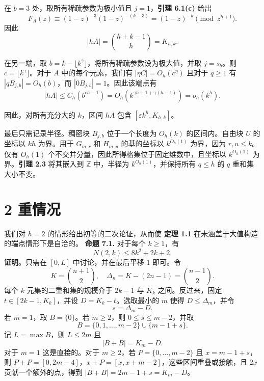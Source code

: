 \documentclass[11pt]{article}
\theoremstyle{break}
\begin{document}
在 $b = 3$ 处，取所有稀疏参数为极小值且 $j = 1$，\textbf{引理 6.1(c)} 给出
\[F_A(z) \equiv (1-z)^{-3}(1-z)^{-(k-3)} = (1-z)^{-k} \pmod{z^{h+1}}.\]
因此
\[|hA| = \binom{h+k-1}{h} = K_{h,k}.\]

在另一端，取 $b = k - \lfloor k^\gamma \rfloor$，将所有稀疏参数设为极大值，并取 $j = s_b$。则 $c = \lfloor k^\gamma \rfloor$。对于 $A$ 中的每个元素，我们有 $|\eta C| = O_h(c^\eta)$ 且对于 $q \ge 1$ 有 $|qB_{j,b}| = O_h(b)$，而 $|0B_{j,b}| = 1$。因此该端点有
\[|hA| \le C_h (b^{ch-1}) = O_h(k^{\gamma h + 1 + \gamma(h-1)}) = o_h(k^h).\]

因此，对所有充分大的 $k$，区间 $hA$ 包含 $[\varepsilon k^h, K_{h,k}]$。

最后只需记录半径。稠密块 $B_{j,b}$ 位于一个长度为 $O_h(k)$ 的区间内。自由块 $U$ 的坐标以 $kh$ 为界。用于 $G_{m,r}$ 和 $H_{m,u}$ 的基的坐标以 $k^{O_h(1)}$ 为界，因为 $r, u \le k$。仅有 $O_h(1)$ 个不交并分量，因此所得格集位于固定维数中，且坐标以 $k^{O_h(1)}$ 为界。\textbf{引理 2.3} 将其嵌入到 $\mathbb{Z}$ 中，半径为 $k^{O_h(1)}$，并保持所有 $q \le h$ 的 $q$ 重和集大小不变。
\section{2 重情况}
我们对 \(h=2\) 的情形给出初等的二次论证，从而使 \textbf{定理 1.1} 在未涵盖于大值构造的端点情形下是自洽的。
\textbf{命题 7.1.} 对于每个 $k \geq 1$，有
\[N(2,k) \leq 8k^2 + 2k + 2.\]
\textbf{证明}。只需在 $[0, L]$ 中讨论，并在最后平移 $1$ 即可。令
\[
K = \binom{n+1}{2}, \quad \Delta_n = K - (2n - 1) = \binom{n-1}{2}.
\]
每个 $k$ 元集的二重和集的规模介于 $2k-1$ 与 $K_k$ 之间。反过来，固定 $t \in [2k-1, K_k]$，并设 $D = K_k - t$。选取最小的 $m$ 使得 $D \leq \Delta_m$，并令
\[
s = \Delta_m - D.
\]
若 $m = 1$，取 $B = \{0\}$。若 $m \geq 2$，则 $0 \leq s \leq m-2$，并取
\[
B = \{0, 1, \dots, m-2\} \cup \{m-1 + s\}.
\]
记 $L = \max B$，则 $L \leq 2m$ 且
\[
|B + B| = K_m - D.
\]
对于 $m = 1$ 这是直接的。对于 $m \ge 2$，若 $P = \{0, \dots, m-2\}$ 且 $x = m-1+s$，则 $P+P = [0, 2m-4]$，$x+P = [x, x+m-2]$，这些区间重叠或接触，且 $2x$ 贡献一个额外的点，得到 $|B+B| = 2m-1+s = K_m - D$。
\end{document}
